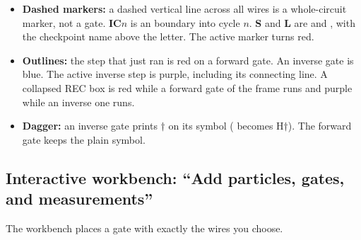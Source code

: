 \begin{itemize}
  \textbf{D$n$} badge above it shows the current DEPTH and counts down as you
  step, then hides when the call is finished. A multi-gate recursive child is
  one \textbf{REC} box spanning its wires, captioned with the child name and
  depth range (for example \texttt{D5 $\rightarrow$ D1}).
  \item \textbf{Dashed markers:} a dashed vertical line across all wires is a
  whole-circuit marker, not a gate. \textbf{IC$n$} is an
   boundary into cycle $n$. \textbf{S} and \textbf{L}
  are  and , with the checkpoint name above
  the letter. The active marker turns red.
  \item \textbf{Outlines:} the step that just ran is red on a forward gate.
  An inverse gate is blue. The active inverse step is purple, including its
  connecting line. A collapsed REC box is red while a forward gate of the
  frame runs and purple while an inverse one runs.
  \item \textbf{Dagger:} an inverse gate prints $\dagger$ on its symbol
  ( becomes H$\dagger$). The forward gate keeps the plain symbol.
\end{itemize}

\subsection{Interactive workbench: ``Add particles, gates, and measurements''}
\hypertarget{ui-workbench}{}

The workbench places a gate with exactly the wires you choose.

